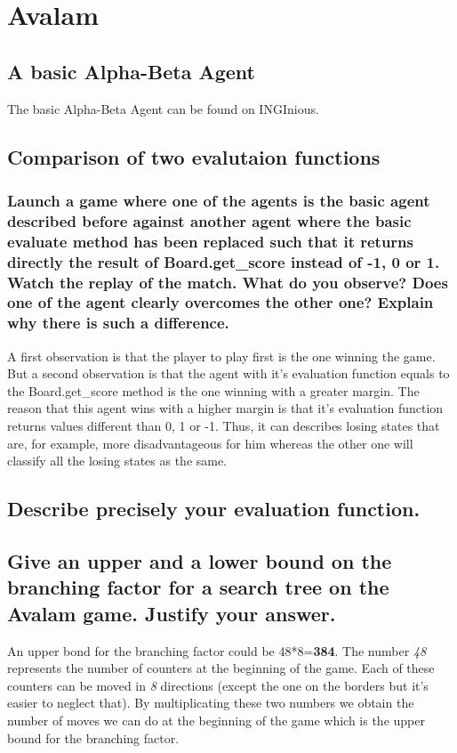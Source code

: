 \documentclass[10pt,a4paper]{article}
\begin{document}
\section{Avalam}

\subsection{A basic Alpha-Beta Agent}

The basic Alpha-Beta Agent can be found on INGInious.

\subsection{Comparison of two evalutaion functions}

\subsubsection{Launch a game where one of the agents is the basic agent described before against another agent where the basic evaluate method has been replaced such that it returns directly the result of Board.get\_score instead of -1, 0 or 1. Watch the replay of the match. What do you observe? Does one of the agent clearly overcomes the other one? Explain why there is such a difference.}

A first observation is that the player to play first is the one winning the game. But a second observation is that the agent with it's evaluation function equals to the Board.get\_score method is the one winning with a greater margin. The reason that this agent wins with a higher margin is that it's evaluation function returns values different than 0, 1 or -1. Thus, it can describes  losing states that are, for example, more disadvantageous for him whereas the other one will classify all the losing states as the same.


\subsection{Describe precisely your evaluation function.}

\subsection{Give an upper and a lower bound on the branching factor for a search tree on the Avalam game. Justify your answer.}

An upper bond for the branching factor could be 48*8=\textbf{384}. The number \textit{48} represents the number of counters at the beginning of the game. Each of these counters can be moved in \textit{8} directions (except the one on the borders but it's easier to neglect that). By multiplicating these two numbers we obtain the number of moves we can do at the beginning of the game which is the upper bound for the branching factor. \\
\end{document}
